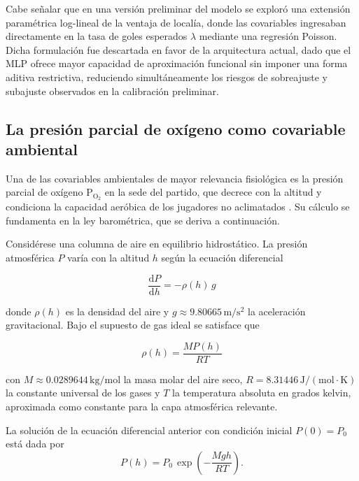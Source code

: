 Cabe se\~nalar que en una versi\'on preliminar del modelo se explor\'o una extensi\'on param\'etrica log-lineal de la ventaja de local\'ia, donde las covariables ingresaban directamente en la tasa de goles esperados $\lambda$ mediante una regresi\'on Poisson. Dicha formulaci\'on fue descartada en favor de la arquitectura actual, dado que el MLP ofrece mayor capacidad de aproximaci\'on funcional sin imponer una forma aditiva restrictiva, reduciendo simult\'aneamente los riesgos de sobreajuste y subajuste observados en la calibraci\'on preliminar.

\subsection{La presi\'on parcial de ox\'igeno como covariable ambiental}
\label{subsec:barometrica}

Una de las covariables ambientales de mayor relevancia fisiol\'ogica es la presi\'on parcial de ox\'igeno $\mathrm{P}_{\mathrm{O}_2}$ en la sede del partido, que decrece con la altitud y condiciona la capacidad aer\'obica de los jugadores no aclimatados \cite{West1996}. Su c\'alculo se fundamenta en la ley barom\'etrica, que se deriva a continuaci\'on.

Consid\'erese una columna de aire en equilibrio hidrost\'atico. La presi\'on atmosf\'erica $P$ var\'ia con la altitud $h$ seg\'un la ecuaci\'on diferencial 

\begin{equation}
	\frac{\mathrm{d}P}{\mathrm{d}h} = -\rho(h)\,g
\end{equation}

donde $\rho(h)$ es la densidad del aire y $g \approx 9{.}80665\,\mathrm{m/s^2}$ la aceleraci\'on gravitacional. Bajo el supuesto de gas ideal se satisface que 

\begin{equation}
	\rho(h) = \frac{MP(h)}{RT}
\end{equation}

con $M \approx 0{.}0289644\,\mathrm{kg/mol}$ la masa molar del aire seco, $R = 8{.}31446\,\mathrm{J/(mol\cdot K)}$ la constante universal de los gases y $T$ la temperatura absoluta en grados kelvin, aproximada como constante para la capa atmosf\'erica relevante.

\begin{prop}\label{prop:barometrica}
	La soluci\'on de la ecuaci\'on diferencial anterior con condici\'on inicial $P(0)=P_0$ est\'a dada por
	\begin{equation}\label{eq:barometrica}
		P(h) = P_0\,\exp\!\left(-\frac{Mgh}{RT}\right).
	\end{equation}
\end{prop}

